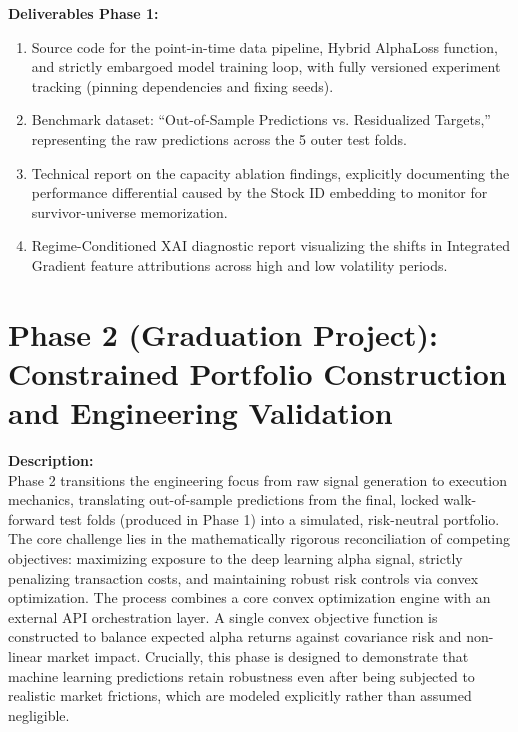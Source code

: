 \documentclass[twoside,final]{hcmut-report}
\begin{document}
\vspace{0.5em}
\textbf{Deliverables Phase 1:}
\begin{enumerate}
    \item Source code for the point-in-time data pipeline, Hybrid AlphaLoss function, and strictly embargoed model training loop, with fully versioned experiment tracking (pinning dependencies and fixing seeds).
    \item Benchmark dataset: ``Out-of-Sample Predictions vs. Residualized Targets,'' representing the raw predictions across the 5 outer test folds.
    \item Technical report on the capacity ablation findings, explicitly documenting the performance differential caused by the Stock ID embedding to monitor for survivor-universe memorization.
    \item Regime-Conditioned XAI diagnostic report visualizing the shifts in Integrated Gradient feature attributions across high and low volatility periods.
\end{enumerate}


\section{Phase 2 (Graduation Project): Constrained Portfolio Construction and Engineering Validation}

\textbf{Description:} \\
Phase 2 transitions the engineering focus from raw signal generation to execution mechanics, translating out-of-sample predictions from the final, locked walk-forward test folds (produced in Phase 1) into a simulated, risk-neutral portfolio. The core challenge lies in the mathematically rigorous reconciliation of competing objectives: maximizing exposure to the deep learning alpha signal, strictly penalizing transaction costs, and maintaining robust risk controls via convex optimization. The process combines a core convex optimization engine with an external API orchestration layer. A single convex objective function is constructed to balance expected alpha returns against covariance risk and non-linear market impact. Crucially, this phase is designed to demonstrate that machine learning predictions retain robustness even after being subjected to realistic market frictions, which are modeled explicitly rather than assumed negligible.
\end{document}
